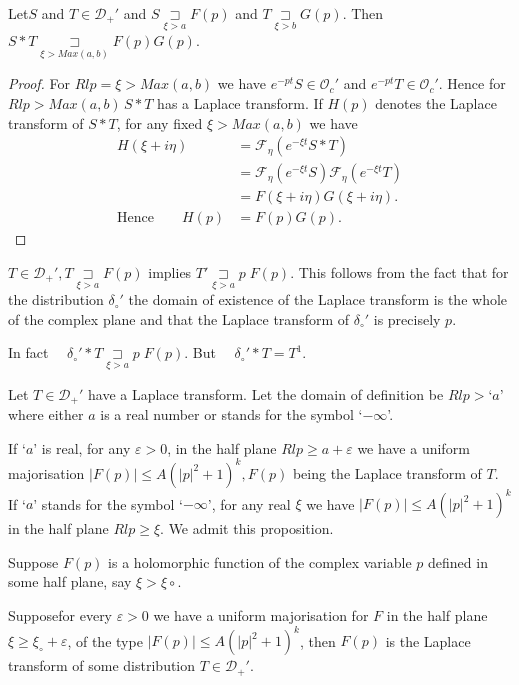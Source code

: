 \begin{prop}\label{chap8:prop8.7}
Let\pageoriginale $S$ and $T \in \mathscr{D}_+'$ and 
$S\underset{\xi > a}{\sqsupset}
F(p)$ and $T \underset{\xi > b}{\sqsupset}G(p)$. Then $S*
T\underset{\xi > Max(a, b)}{\sqsupset}F(p)G(p)$.
\end{prop}
\begin{proof}
For $Rl p = \xi > Max (a, b)$ we have $e^{-pt} S \in \mathscr{O}_c'$
and $e^{-pt}T\in \mathscr{O}_c'$. Hence for $Rl p > Max (a, b)\,S * T$
has a Laplace transform. If $H(p)$ denotes the Laplace transform of $S
* T$, for any fixed $\xi > Max (a, b)$ we have 
\begin{align*}
H(\xi + i\eta) &= \mathscr{F}_\eta(e^{-\xi t}S*T)\\
&= \mathscr{F}_\eta(e^{-\xi t}S) \mathscr{F}_\eta (e^{-\xi t}T)\\
&= F(\xi + i\eta) G(\xi + i\eta).\\
\text{Hence}\qquad H(p)&= F(p) G(p).
\end{align*}

\end{proof}
\begin{coro*}
$T \in \mathscr{D}_+', T\underset{\xi > a}{\sqsupset} F(p)$ implies
  $T'\underset{\xi >a}{\sqsupset} p\; F(p)$. This follows from the fact
  that for the distribution $\delta_\circ'$ the domain of existence of
  the Laplace transform is the whole of the complex plane and that the
  Laplace transform of $\delta_\circ'$ is precisely $p$.

In fact $\quad \delta_\circ' * T \underset{\xi >a}{\sqsupset} p\; F(p)$.
But $\quad\delta_\circ' * T = T^1$.
\end{coro*}
\begin{prop}\label{chap8:prop8.8}
Let $T\in \mathscr{D}_+'$ have a Laplace transform. Let the domain of
definition be $Rl p > \text{`$a$'}$ where either $a$ is a real number or stands
for the symbol `$-\infty$'. 
\end{prop}

If `$a$' is real, for any $\varepsilon > 0$, in the half plane $Rl p \geq
a+\varepsilon$ we have a uniform majorisation $|F(p)|\leq A(|p|^2 +1)^k, F(p)$
being the Laplace transform of $T$. If `$a$' stands for the symbol
`$-\infty$', for any real $\xi$ we have $|F(p)|\leq A(|p|^2+1)^k$ in
the half plane $Rl p \geq \xi$. We admit this proposition.
\begin{prop}\label{chap8:prop8.9}
Suppose $F(p)$ is a holomorphic function of the complex variable $p$
defined in some half plane, say $\xi > \xi \circ$.

Suppose\pageoriginale for every $\varepsilon > 0$ we have a uniform majorisation for 
$F$ in the half plane $\xi \geq \xi_\circ + \varepsilon$, of the type $|F(p)| \leq
A(|p|^2+1)^k$, then $F(p)$ is the Laplace transform of some
distribution $T \in \mathscr{D}_+'$. 
\end{prop}

